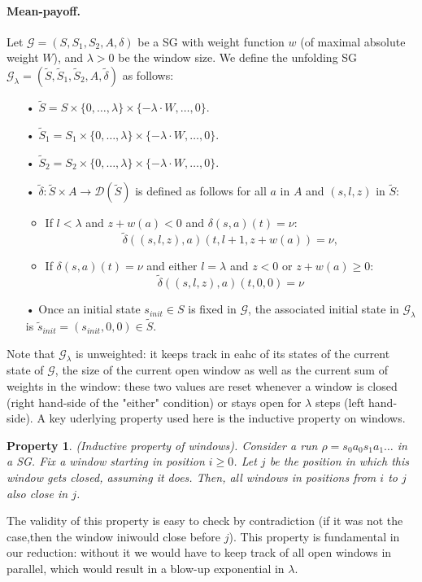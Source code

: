 \documentclass{article}
\newcommand{\CG}{\mathcal{G}}
\newcommand{\SG}{(S, S_1, S_2, A, \delta)}
\newcommand{\CD}{\mathcal{D}}
\theoremstyle{plain}
\newtheorem{property}{Property}
\begin{document}
\paragraph{Mean-payoff.} Let $\CG = \SG$ be a SG with weight function $w$ (of maximal absolute weight $W$), and $\lambda > 0$ be the window size. We define the unfolding SG $\CG_\lambda = (\tilde{S}, \tilde{S}_1, \tilde{S}_2, A, \tilde{\delta})$ as follows:
\begin{itemize}
\item[•] $\tilde{S} = S \times \{0, \dots, \lambda\} \times \{- \lambda \cdot W, \dots, 0\}$.
\item[•] $\tilde{S}_1 = S_1 \times \{0, \dots, \lambda\} \times \{- \lambda \cdot W, \dots, 0\}$.
\item[•] $\tilde{S}_2 = S_2 \times \{0, \dots, \lambda\} \times \{- \lambda \cdot W, \dots, 0\}$.
\item[•] $\tilde{\delta}: \tilde{S} \times A \rightarrow \CD (\tilde{S})$ is defined as follows for all $a$ in $A$ and $(s, l, z)$ in $\tilde{S}$:
\begin{itemize}
\item If $l < \lambda$ and $z + w(a) < 0$ and $\delta(s, a)(t) = \nu$:
$$\tilde{\delta}((s, l, z), a)(t, l+1, z+w(a)) = \nu,$$
\item If $\delta(s, a)(t) = \nu$ and either $l = \lambda$ and $z < 0$ or $z+w(a) \geqslant 0$:
$$\tilde{\delta}((s, l, z), a)(t, 0, 0) = \nu$$
\end{itemize}
\item[•] Once an initial state $s_{init} \in S$ is fixed in $\CG$, the associated initial state in $\CG_{\lambda}$ is $\tilde{s}_{init} = (s_{init}, 0, 0) \in \tilde{S}.$
\end{itemize}
Note that $\CG_{\lambda}$ is unweighted: it keeps track in eahc of its states of the current state of $\CG$, the size of the current open window as well as the current sum of weights in the window: these two values are reset whenever a window is closed (right hand-side of the "either" condition) or stays open for $\lambda$ steps (left hand-side). A key uderlying property used here is the inductive property on windows.

\begin{property} (Inductive property of windows).
Consider a run $\rho = s_0 a_0 s_1 a_1 \dots$ in a SG. Fix a window starting in position $i \geqslant 0$. Let $j$ be the position in which this window gets closed, assuming it does. Then, all windows in positions from $i$ to $j$ also close in $j$.
\end{property}
The validity of this property is easy to check by contradiction (if it was not the case,then the window iniwould close before $j$). This property is fundamental in our reduction: without it we would have to keep track of all open windows in parallel, which would result in a blow-up exponential in $\lambda$.
\end{document}
